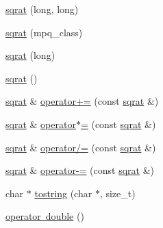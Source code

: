 \begin{DoxyCompactItemize}
\item 
\mbox{\hyperlink{classsqrat_a37c42a6db5d602e438935e2a8396b960}{sqrat}} (long, long)
\item 
\mbox{\hyperlink{classsqrat_a9ae811495db9b4763bef65bbb4be6260}{sqrat}} (mpq\+\_\+class)
\item 
\mbox{\hyperlink{classsqrat_a5a582658adaae3fa6e4a2833c20b657d}{sqrat}} (long)
\item 
\mbox{\hyperlink{classsqrat_a133ea2fa104facfe3057277d096235d2}{sqrat}} ()
\item 
\mbox{\hyperlink{classsqrat}{sqrat}} \& \mbox{\hyperlink{classsqrat_ada81ae4a5701bba66394cf1a69786e70}{operator+=}} (const \mbox{\hyperlink{classsqrat}{sqrat}} \&)
\item 
\mbox{\hyperlink{classsqrat}{sqrat}} \& \mbox{\hyperlink{classsqrat_aae14e57b87f37f2073e809efd51fbe8e}{operator$\ast$=}} (const \mbox{\hyperlink{classsqrat}{sqrat}} \&)
\item 
\mbox{\hyperlink{classsqrat}{sqrat}} \& \mbox{\hyperlink{classsqrat_a348781af63f0a423ad0a84342fdccb49}{operator/=}} (const \mbox{\hyperlink{classsqrat}{sqrat}} \&)
\item 
\mbox{\hyperlink{classsqrat}{sqrat}} \& \mbox{\hyperlink{classsqrat_a774a997c67358fea54d41cd8f29bdd3a}{operator-\/=}} (const \mbox{\hyperlink{classsqrat}{sqrat}} \&)
\item 
char $\ast$ \mbox{\hyperlink{classsqrat_a0e94b27cf419cf8888da52e854f9d60b}{tostring}} (char $\ast$, size\+\_\+t)
\item 
\mbox{\hyperlink{classsqrat_af1d90ee59e36a87aa7a94dacdab875de}{operator double}} ()
\end{DoxyCompactItemize}
